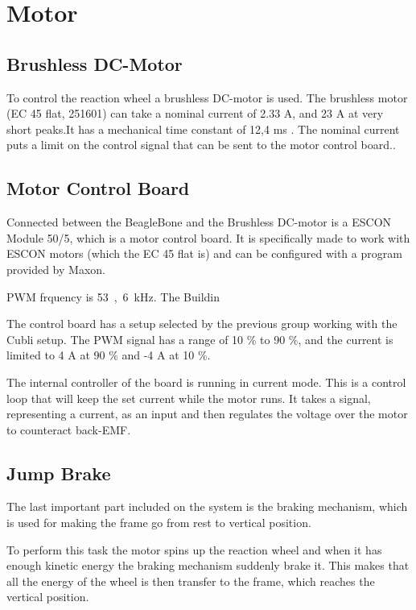 \section{Motor}
\label{sec:Motor}


\subsection{Brushless DC-Motor}
To control the reaction wheel a brushless DC-motor is used. 
The brushless motor (EC 45 flat, 251601) can take a nominal current of 2.33 A, and 23 A at very short peaks.It has a mechanical time constant of 12,4 ms \cite{MaxonMotors}. The nominal current puts a limit on the control signal that can be sent to the motor control board..


\subsection{Motor Control Board}
Connected between the BeagleBone and the Brushless DC-motor is a ESCON Module 50/5, which is a motor control board. It is specifically made to work with ESCON motors (which the EC 45 flat is) and can be configured with a program provided by Maxon.

PWM frquency is \si{53,6 kHz}.
The Buildin 

The control board has a setup selected by the previous group working with the Cubli setup. The PWM signal has a range of 10 \% to 90 \%, and the current is limited to 4 A at 90 \% and -4 A at 10 \%. 

The internal controller of the board is running in current mode. This is a control loop that will keep the set current while the motor runs. It takes a signal, representing a current, as an input and then regulates the voltage over the motor to counteract back-EMF.

\subsection{Jump Brake}
The last important part included on the system is the braking mechanism, which is used for making the frame go from rest to vertical position. 

To perform this task the motor spins up the reaction wheel and when it has enough kinetic energy the braking mechanism suddenly brake it. This makes that all the energy of the wheel is then transfer to the frame, which reaches the vertical position.
